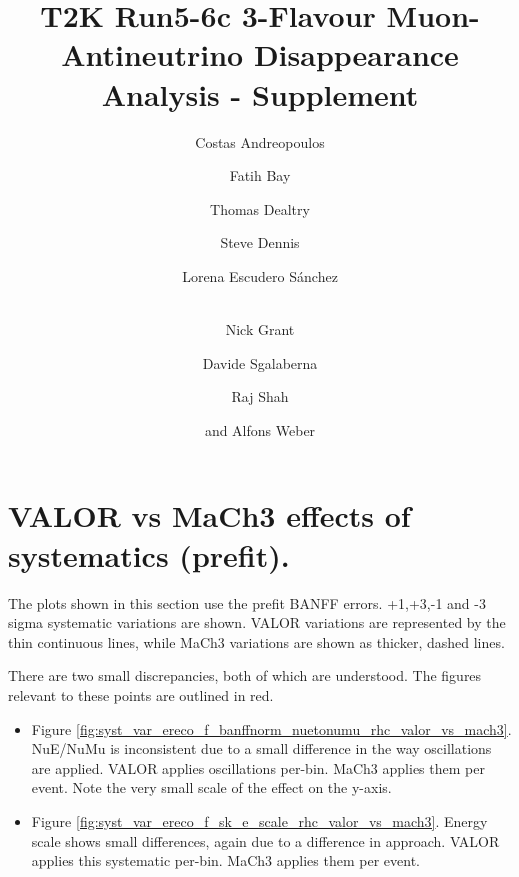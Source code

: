 \documentclass[final]{elsarticle}
\begin{document}
%
%

\begin{frontmatter}
\title{
  T2K Run5-6c 3-Flavour Muon-Antineutrino Disappearance Analysis - Supplement
}

\vspace*{0.7cm}

\author[RAL,LIV]  {Costas Andreopoulos}
\author[ETHZ]     {Fatih Bay}
\author[RAL,OXF]  {Thomas Dealtry}
\author[RAL,WAR]  {Steve Dennis}
\author[IFIC]     {Lorena Escudero S\'anchez}
\author[LANCS]    {\\Nick Grant}
\author[ETHZ]     {Davide Sgalaberna}
\author[RAL,OXF]  {Raj Shah}
\author[RAL,OXF]  {and Alfons Weber}

\address[RAL]   {Science \& Technology Facilities Council (STFC), Rutherford Appleton Laboratory,\\ Harwell Oxford Campus, OX11 0QX, UK}
\address[LIV]   {University of Liverpool, Physics Department,\\ Liverpool, L69 7ZE, UK} 
\address[ETHZ]  {ETH Zurich, Institute for Particle Physics,\\ 8092 Zurich, Switzerland}
\address[OXF]   {University of Oxford, Subdepartment of Particle Physics,\\ Oxford, OX1 3RH, UK}
\address[WAR]   {University of Warwick, Physics Department,\\ Coventry, CV4 7AL, UK}
\address[IFIC]  {CSIC and University of Valencia, Instituto de Fisica Corpuscular, \\ E-46071 Valencia, Spain}
\address[LANCS] {Lancaster University, Physics Department,\\ Lancaster, LA1 4YB, UK}

\end{frontmatter}

\section{VALOR vs MaCh3 effects of systematics (prefit).}

The plots shown in this section use the prefit BANFF errors.
+1,+3,-1 and -3 sigma systematic variations are shown.
VALOR variations are represented by the thin continuous lines,
while MaCh3 variations are shown as thicker, dashed lines.

There are two small discrepancies, both of which are understood.
The figures relevant to these points are outlined in red.

\begin{itemize}
 \item Figure \ref{fig:syst_var_ereco_f_banffnorm_nuetonumu_rhc_valor_vs_mach3}.
  NuE/NuMu is inconsistent due to a small difference in the way oscillations are applied.
  VALOR applies oscillations per-bin. MaCh3 applies them per event.
  Note the very small scale of the effect on the y-axis.
 \item Figure \ref{fig:syst_var_ereco_f_sk_e_scale_rhc_valor_vs_mach3}.
  Energy scale shows small differences, again due to a difference in approach.
  VALOR applies this systematic per-bin. MaCh3 applies them per event.
\end{itemize}
\end{document}
